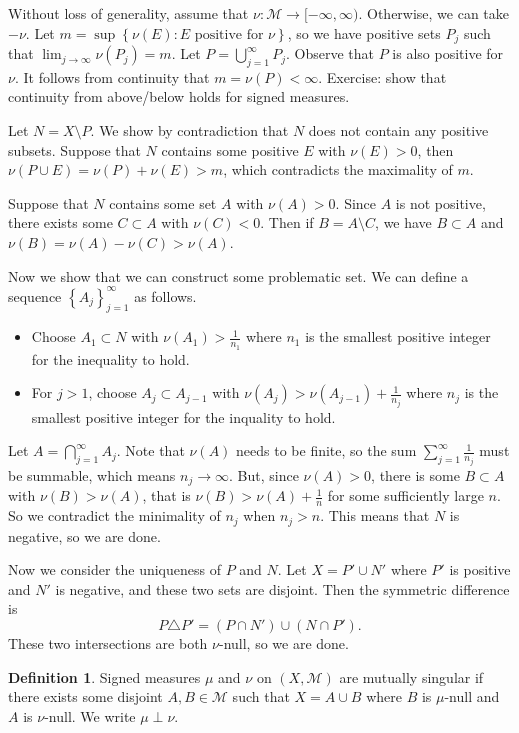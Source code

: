 \documentclass[11pt]{article}
\theoremstyle{definition}
\newtheorem{defn}{Definition}[section]
\newcommand{\sm}[0]{\setminus}
\newcommand{\set}[1]{\left\{ #1 \right\}}
\newcommand{\m}[1]{\mathcal{#1}}
\begin{document}
\proof
Without loss of generality, assume that $\nu:\m{M}\to[-\infty,\infty)$. Otherwise, we can
take $-\nu$. Let $m=\sup\set{\nu(E):E\text{ positive for }\nu}$, so we have positive sets
$P_j$ such that $\lim_{j\to\infty}\nu(P_j)=m$. Let $P=\bigcup_{j=1}^\infty P_j$. Observe
that $P$ is also positive for $\nu$. It follows from continuity that $m=\nu(P)<\infty$.
{\color{red}Exercise: show that continuity from above/below holds for signed measures.}

Let $N=X\sm P$. We show by contradiction that $N$ does not contain any positive subsets.
Suppose that $N$ contains some positive $E$ with $\nu(E)>0$, then $\nu(P\cup E) =
\nu(P)+\nu(E) > m$, which contradicts the maximality of $m$.

Suppose that $N$ contains some set $A$ with $\nu(A)>0$. Since $A$ is not positive,
there exists some $C\subset A$ with $\nu(C)<0$. Then if $B=A\sm C$, we have $B\subset A$
and $\nu(B)=\nu(A)-\nu(C)>\nu(A)$.

Now we show that we can construct some problematic set.  We can define a sequence
$\set{A_j}_{j=1}^\infty$ as follows.
\begin{itemize}
  \item Choose $A_1\subset N$ with $\nu(A_1)>\frac1{n_1}$ where $n_1$ is the smallest
  positive integer for the inequality to hold.
  \item For $j>1$, choose $A_j\subset A_{j-1}$ with $\nu(A_j)>\nu(A_{j-1})+\frac1{n_j}$
  where $n_j$ is the smallest positive integer for the inquality to hold.
\end{itemize}
Let $A=\bigcap_{j=1}^\infty A_j$. Note that $\nu(A)$ needs to be finite, so the sum
$\sum_{j=1}^\infty\frac1{n_j}$ must be summable, which means $n_j\to\infty$.  But, since
$\nu(A)>0$, there is some $B\subset A$ with $\nu(B)>\nu(A)$, that is
$\nu(B)>\nu(A)+\frac1n$ for some sufficiently large $n$. So we contradict the minimality
of $n_j$ when $n_j>n$. This means that $N$ is negative, so we are done. 

Now we consider the uniqueness of $P$ and $N$. Let $X=P'\cup N'$ where $P'$ is positive
and $N'$ is negative, and these two sets are disjoint. Then the symmetric difference is 
\[
  P\triangle P' = (P\cap N') \cup (N\cap P') .
\]
These two intersections are both $\nu$-null, so we are done. 
\qedhere


\begin{defn}
  Signed measures $\mu$ and $\nu$ on $(X,\m{M})$ are mutually singular if there exists
  some disjoint $A,B\in\m{M}$ such that $X=A\cup B$ where $B$ is $\mu$-null and $A$ is
  $\nu$-null. We write $\mu\perp\nu$. 
\end{defn}
\end{document}
